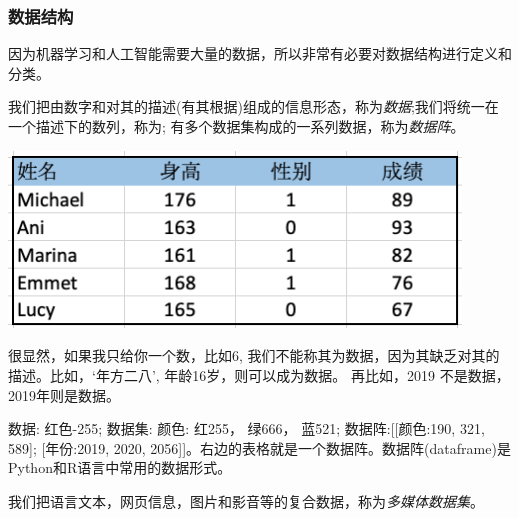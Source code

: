 \documentclass[12pt]{article}
\numberwithin{figure}{section}
\numberwithin{equation}{section}
\begin{document}
\subsubsection{数据结构}

因为机器学习和人工智能需要大量的数据，所以非常有必要对数据结构进行定义和分类。

\begin{definition}
	我们把由数字和对其的描述(有其根据)组成的信息形态，称为\textit{数据};我们将统一在一个描述下的数列，称为; 有多个数据集构成的一系列数据，称为\textit{数据阵}。
\end{definition}
\begin{marginfigure}
	\centering
	\includegraphics[width=0.9\textwidth]{fig/dataframeEx}
\end{marginfigure}
\begin{remark}
很显然，如果我只给你一个数，比如6, 我们不能称其为数据，因为其缺乏对其的描述。比如，`年方二八’, 年龄16岁，则可以成为数据。	再比如，2019 不是数据，2019年则是数据。
\end{remark}

\begin{example}
数据: 红色-255; 数据集: 颜色: 红255， 绿666， 蓝521; 数据阵:[[颜色:190, 321, 589]; [年份:2019, 2020, 2056]]。右边的表格就是一个数据阵。数据阵(dataframe)是Python和R语言中常用的数据形式。
\end{example}

\begin{definition}
	我们把语言文本，网页信息，图片和影音等的复合数据，称为\textit{多媒体数据集}。
\end{definition}
\end{document}
